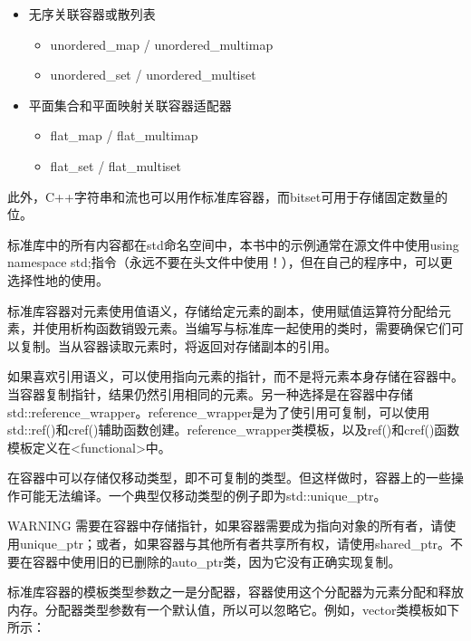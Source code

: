 \begin{itemize}
\item
无序关联容器或散列表
\begin{itemize}
\item
unordered\_map / unordered\_multimap

\item
unordered\_set / unordered\_multiset
\end{itemize}

\item
平面集合和平面映射关联容器适配器
\begin{itemize}
\item
flat\_map / flat\_multimap

\item
flat\_set / flat\_multiset
\end{itemize}
\end{itemize}

此外，C++字符串和流也可以用作标准库容器，而bitset可用于存储固定数量的位。

标准库中的所有内容都在std命名空间中，本书中的示例通常在源文件中使用using namespace std;指令（永远不要在头文件中使用！），但在自己的程序中，可以更选择性地的使用。


标准库容器对元素使用值语义，存储给定元素的副本，使用赋值运算符分配给元素，并使用析构函数销毁元素。当编写与标准库一起使用的类时，需要确保它们可以复制。当从容器读取元素时，将返回对存储副本的引用。

如果喜欢引用语义，可以使用指向元素的指针，而不是将元素本身存储在容器中。当容器复制指针，结果仍然引用相同的元素。另一种选择是在容器中存储std::reference\_wrapper。reference\_wrapper是为了使引用可复制，可以使用std::ref()和cref()辅助函数创建。reference\_wrapper类模板，以及ref()和cref()函数模板定义在<functional>中。

在容器中可以存储仅移动类型，即不可复制的类型。但这样做时，容器上的一些操作可能无法编译。一个典型仅移动类型的例子即为std::unique\_ptr。

\begin{myWarning}{WARNING}
需要在容器中存储指针，如果容器需要成为指向对象的所有者，请使用unique\_ptr；或者，如果容器与其他所有者共享所有权，请使用shared\_ptr。不要在容器中使用旧的已删除的auto\_ptr类，因为它没有正确实现复制。
\end{myWarning}

标准库容器的模板类型参数之一是分配器，容器使用这个分配器为元素分配和释放内存。分配器类型参数有一个默认值，所以可以忽略它。例如，vector类模板如下所示：

